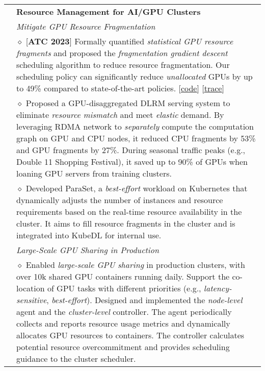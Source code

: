 \documentclass[letterpaper, 10pt]{article}
\begin{document}
\begin{longtable}{p{0.7in}p{6.0in}}
& \textbf{Resource Management for AI/GPU Clusters} \\

& \textit{\emph{Mitigate GPU Resource Fragmentation}} \\
    & $\diamond$ [\textbf{ATC 2023}] Formally quantified \textit{statistical GPU resource fragments} and proposed the \textit{fragmentation gradient descent} scheduling algorithm to reduce resource fragmentation. Our scheduling policy can significantly reduce \textit{unallocated} GPUs by up to 49\% compared to state-of-the-art policies. [\href{https://github.com/hkust-adsl/kubernetes-scheduler-simulator}{\underline{code}}] [\href{https://github.com/alibaba/clusterdata/tree/master/cluster-trace-gpu-v2023}{\underline{trace}}] \\

    & $\diamond$
    Proposed a GPU-disaggregated DLRM serving system to eliminate \textit{resource mismatch} and meet \textit{elastic} demand.
    By leveraging RDMA network to \textit{separately} compute the computation graph on GPU and CPU nodes, it reduced CPU fragments by 53\% and GPU fragments by 27\%.
    During seasonal traffic peaks (e.g., Double 11 Shopping Festival), it saved up to 90\% of GPUs when loaning GPU servers from training clusters. \\

    & $\diamond$ Developed ParaSet, a \textit{best-effort} workload on Kubernetes that dynamically adjusts the number of instances and resource requirements based on the real-time resource availability in the cluster. It aims to fill resource fragments in the cluster and is integrated into KubeDL for internal use. \\

& \textit{\emph{Large-Scale GPU Sharing in Production}} \\
    & $\diamond$ Enabled \textit{large-scale GPU sharing} in production clusters, with over 10k shared GPU containers running daily. Support the co-location of GPU tasks with different priorities (e.g., \textit{latency-sensitive}, \textit{best-effort}). Designed and implemented the \textit{node-level} agent and the \textit{cluster-level} controller. The agent periodically collects and reports resource usage metrics and dynamically allocates GPU resources to containers. The controller calculates potential resource overcommitment and provides scheduling guidance to the cluster scheduler. \\


\end{longtable}
\end{document}
